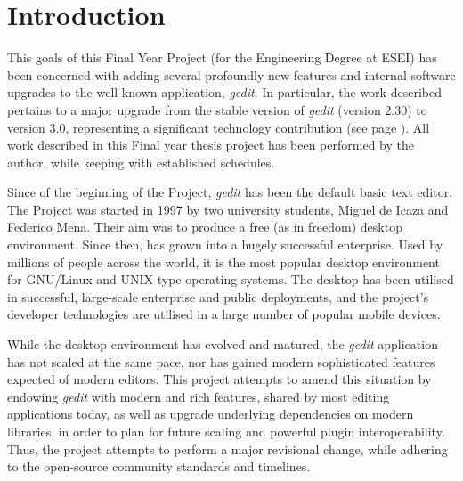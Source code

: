 
\chapter{Introduction}


This goals of this Final Year Project (for the Engineering Degree at ESEI) has been 
concerned with adding several profoundly new features and internal software upgrades 
to the well known \GNOME application, \emph{gedit}.  In particular, the work 
described pertains to a major upgrade from the stable version of \emph{gedit} (version 2.30) 
to version 3.0, representing a significant technology contribution 
(see page \pageref{chap:Technologies}).   All work described in this Final year thesis project 
has been performed by the author, while keeping with established \GNOME schedules.


Since of the beginning of the \GNOME Project, \emph{gedit} has been the \GNOME default basic 
text editor. The \GNOME Project was started in 1997 by two university students, Miguel de Icaza and 
Federico Mena. Their aim was to produce a free (as in freedom) desktop environment. Since 
then, \GNOME has grown into a hugely successful enterprise. Used by millions of people 
across the world, it is the most popular desktop environment for GNU/Linux and UNIX-type 
operating systems. The desktop has been utilised in successful, large-scale enterprise and 
public deployments, and the project’s developer technologies are utilised in a large number 
of popular mobile devices\cite{website:gnome}. 




While the desktop environment has evolved and matured, the \emph{gedit} application has 
not scaled at the same pace, nor has gained modern sophisticated features expected of 
modern editors.   This project attempts to amend this situation by endowing \emph{gedit} 
with modern and rich features, shared by most editing applications today, as well 
as upgrade underlying dependencies on modern libraries, in order to plan for future 
scaling and powerful plugin interoperability.    Thus, the project 
attempts to perform a major revisional change, while adhering to the open-source community 
standards and timelines. 

















